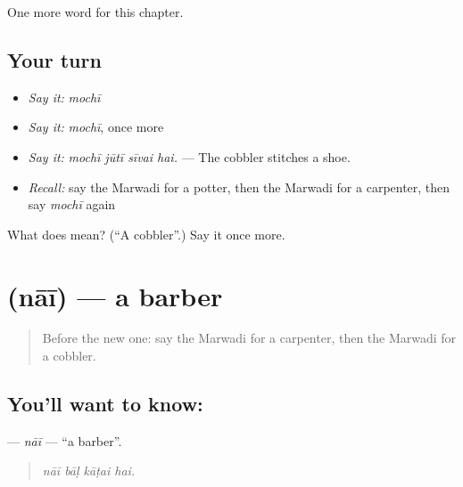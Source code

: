 \begin{grammarlens}[title={What you've built}]
One more word for this chapter.
\end{grammarlens}

\subsection*{Your turn}
\begin{itemize}
\raggedright
  \item \emph{Say it:} \emph{mochī}
  \item \emph{Say it:} \emph{mochī}, once more
  \item \emph{Say it:} \emph{mochī jūtī sīvai hai.} — The cobbler stitches a shoe.
  \item \emph{Recall:} say the Marwadi for a potter, then the Marwadi for a carpenter, then say \emph{mochī} again
\end{itemize}

\begin{tcolorbox}[breakable,colback=teal!4,colframe=teal!35!black,title={Before you move on}]
What does  mean? (\textquotedblleft{}A cobbler\textquotedblright{}.) Say it once more.
\end{tcolorbox}
\section[\texorpdfstring{\mw{नाई} (nāī)}{नाई (nāī)}]{ (nāī) — a barber}

\label{lesson:MW-C265-nai}



\begin{quote}
Before the new one: say the Marwadi for a carpenter, then the Marwadi for a cobbler.
\end{quote}

\subsection*{You'll want to know: }
\textbf{} — \emph{nāī} — \textquotedblleft{}a barber\textquotedblright{}.

\begin{quote}
   
\end{quote}

\begin{quote}
\emph{nāī bāḷ kāṭai hai.}
\end{quote}

